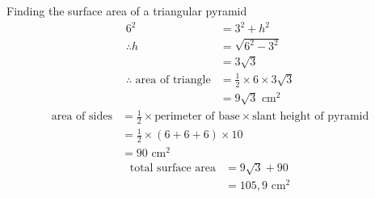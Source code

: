\begin{wex}{Finding the surface area of a triangular pyramid}
{\begin{align*}
 6^2 &= 3^2+h^2\\
\therefore h&=\sqrt{6^2-3^2}\\
&=3\sqrt{3}\\
\therefore \mbox{ area of triangle} &= \frac{1}{2} \times 6 \times 3\sqrt{3}\\
&=9\sqrt{3}\mbox{ cm}^2
\end{align*}
\begin{align*}
 \mbox{area of sides} &= \frac{1}{2} \times \mbox{perimeter of base}\times\mbox{slant height of pyramid}\\
&= \frac{1}{2} \times (6+6+6)\times10\\
&=90\mbox{ cm}^2
\end{align*}
\begin{align*}
 \mbox{total surface area} &= 9\sqrt{3} + 90\\
&=105,9\mbox{ cm}^2
\end{align*}
}
\end{wex}

